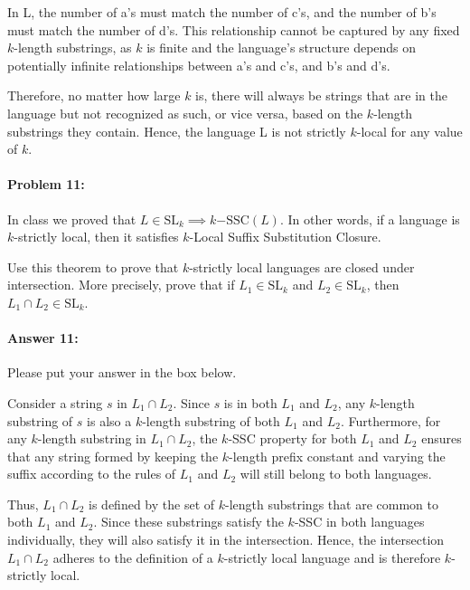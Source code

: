 \documentclass[10pt]{article}
\newenvironment{AnswerBox}{\begin{mdframed}[style=simple]}{\end{mdframed}}
\begin{document}
\begin{AnswerBox}%

    In L, the number of a's must match the number of c's, and the number of b's must match the number of d's. This relationship cannot be captured by any fixed $k$-length substrings, as $k$ is finite and the language's structure depends on potentially infinite relationships between a's and c's, and b's and d's. 

    Therefore, no matter how large $k$ is, there will always be strings that are in the language but not recognized as such, or vice versa, based on the $k$-length substrings they contain. Hence, the language L is not strictly $k$-local for any value of $k$.
    
\end{AnswerBox}%


\hrulefill %

\paragraph{Problem 11:}

In class we proved that
$L \in \mathrm{SL}_k \implies k\mathrm{-SSC}(L)$. In other words, if a
language is $k$-strictly local, then it satisfies $k$-Local Suffix Substitution
Closure.

Use this theorem to prove that $k$-strictly local languages
are closed under intersection. More precisely, prove that if
$L_1 \in \mathrm{SL}_k$ and $L_2 \in \mathrm{SL}_k$, then
$L_1 \cap L_2 \in \mathrm{SL}_k$.

\paragraph{Answer 11:}  Please put your answer in the box below.


\begin{AnswerBox}%

    Consider a string $s$ in $L_1 \cap L_2$. Since $s$ is in both $L_1$ and $L_2$, any $k$-length substring of $s$ is also a $k$-length substring of both $L_1$ and $L_2$. Furthermore, for any $k$-length substring in $L_1 \cap L_2$, the $k$-SSC property for both $L_1$ and $L_2$ ensures that any string formed by keeping the $k$-length prefix constant and varying the suffix according to the rules of $L_1$ and $L_2$ will still belong to both languages.

    Thus, $L_1 \cap L_2$ is defined by the set of $k$-length substrings that are common to both $L_1$ and $L_2$. Since these substrings satisfy the $k$-SSC in both languages individually, they will also satisfy it in the intersection. Hence, the intersection $L_1 \cap L_2$ adheres to the definition of a $k$-strictly local language and is therefore $k$-strictly local.

    
\end{AnswerBox}%
\end{document}
